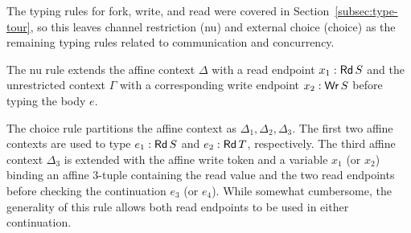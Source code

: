 The typing rules for fork, write, and read were covered in
Section~\ref{subsec:type-tour}, so this leaves channel restriction (nu) and
external choice (choice) as the remaining typing rules related to communication
and concurrency.

The nu rule extends the affine context $\Delta$ with a read endpoint $x_1 : \textnormal{\textsf{Rd}}\,S$
and the unrestricted context $\Gamma$ with a corresponding write endpoint $x_2
: \textnormal{\textsf{Wr}}\,S$ before typing the body $e$.

The choice rule partitions the affine context as $\Delta_1,\Delta_2,\Delta_3$. The first two
affine contexts are used to type $e_1 : \textnormal{\textsf{Rd}}\,S$ and $e_2 : \textnormal{\textsf{Rd}}\,T$,
respectively. The third affine context $\Delta_3$ is extended with the affine write
token and a variable $x_1$ (or $x_2$) binding an affine 3-tuple containing the
read value and the two read endpoints before checking the continuation $e_3$ (or
$e_4$). While somewhat cumbersome, the generality of this rule allows both read
endpoints to be used in either continuation.


%

